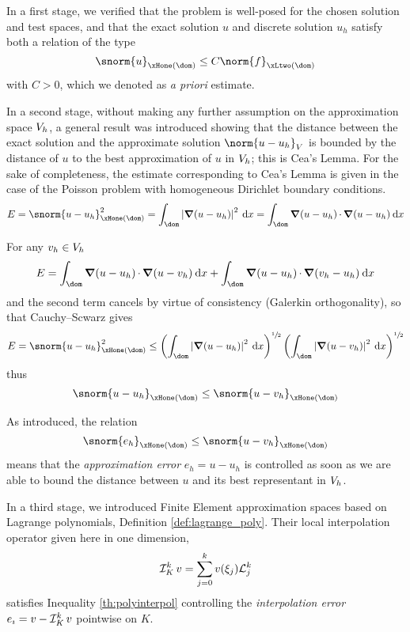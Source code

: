 \medskip
In a first stage, we verified that the problem is well-posed for the chosen solution and test spaces, and that the exact solution $u$ and discrete solution $u_h$ satisfy both a relation of the type
\begin{equation*}
\snorm{u}_{\xHone(\dom)} \leq C \norm{f}_{\xLtwo(\dom)}
\end{equation*}
with $C > 0$, which we denoted as \textit{a priori} estimate.

\medskip
In a second stage, without making any further assumption on the approximation space ${{V}}_h$, a general result was introduced showing that the distance between the exact solution and the approximate solution $\norm{u - u_h}_{\xV}$ is bounded by the distance of $u$ to the best approximation of $u$ in ${{V}}_h$; this is Cea's Lemma.
For the sake of completeness, the estimate corresponding to Cea's Lemma is given in the case of the Poisson problem with homogeneous Dirichlet boundary conditions.
\begin{equation*}
E = \snorm{u - u_h}^2_{\xHone(\dom)} = \int_\dom \Abs{\Grad(u - u_h)}^2\md x = \int_\dom \Grad(u - u_h)\xDot\Grad(u - u_h) \md x
\end{equation*}

For any $v_h\in{{V}}_h$
\begin{equation*}
E = \int_\dom \Grad(u - u_h)\xDot\Grad(u - v_h) \md x + \int_\dom \Grad(u - u_h)\xDot\Grad(v_h - u_h) \md x
\end{equation*}
and the second term cancels by virtue of consistency (Galerkin orthogonality), so that Cauchy--Scwarz gives
\begin{equation*}
E = \snorm{u - u_h}^2_{\xHone(\dom)} \leq \left(\int_\dom \Abs{\Grad(u - u_h)}^2 \md x\right)^{\sfrac{1}{2}} \left(\int_\dom \Abs{\Grad(u - v_h)}^2 \md x\right)^{\sfrac{1}{2}}
\end{equation*}
thus
\begin{equation*}
\snorm{u - u_h}_{\xHone(\dom)} \leq \snorm{u - v_h}_{\xHone(\dom)}
\end{equation*}


As introduced, the relation
\begin{equation}\label{eq:error_estimate_h1}
\snorm{e_h}_{\xHone(\dom)} \leq \snorm{u - v_h}_{\xHone(\dom)}
\end{equation}
means that the \textit{approximation error} $e_h = u - u_h$ is controlled as soon as we are able to bound the distance between $u$ and its best representant in ${{V}}_h$.

\medskip
In a third stage, we introduced Finite Element approximation spaces based on Lagrange polynomials, Definition \ref{def:lagrange_poly}.
Their local interpolation operator given here in one dimension,
\begin{equation*}
\mathop{\mathcal{I}_{K}^{k}} v = \sum_{j=0}^k v(\xi_j) \mathcal L^{k}_{j}
\end{equation*}
satisfies Inequality \eqref{th:polyinterpol} controlling the \textit{interpolation error} $e_\imath = v - \mathop{\mathcal{I}_{K}^{k}} v$ pointwise on $K$.

